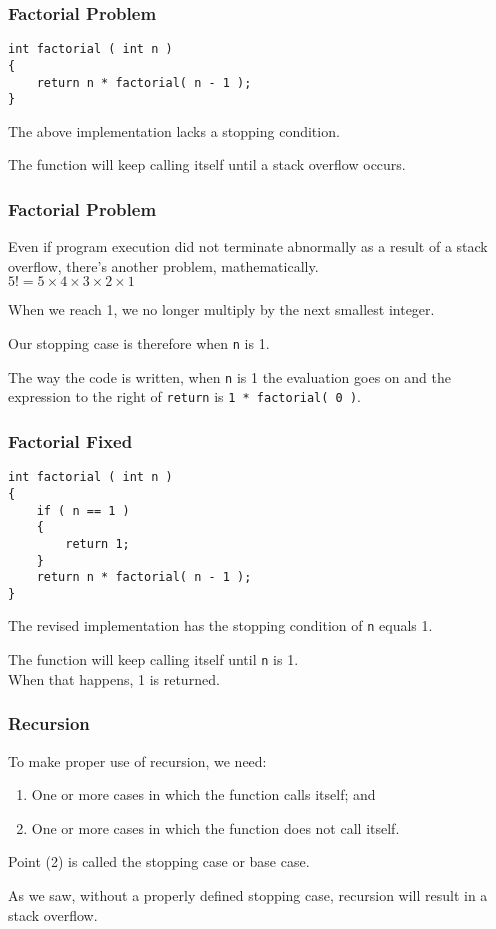 \begin{frame}[fragile]
\frametitle{Factorial Problem}
\begin{verbatim}
int factorial ( int n )
{
    return n * factorial( n - 1 );
}
\end{verbatim}

The above implementation lacks a \alert{stopping condition}.

The function will keep calling itself until a stack overflow occurs.

\end{frame}

\begin{frame}
\frametitle{Factorial Problem}

Even if program execution did not terminate abnormally as a result of a stack overflow, there's another problem, mathematically.\\
\quad $5! = 5 \times 4 \times 3 \times 2 \times 1$

When we reach 1, we no longer multiply by the next smallest integer.

Our stopping case is therefore when \texttt{n} is 1.

The way the code is written, when \texttt{n} is 1 the evaluation goes on and the expression to the right of \texttt{return} is \texttt{1 * factorial( 0 )}. 

\end{frame}

\begin{frame}[fragile]
\frametitle{Factorial Fixed}
\begin{verbatim}
int factorial ( int n )
{
    if ( n == 1 )
    {
        return 1;
    }
    return n * factorial( n - 1 );
}
\end{verbatim}

The revised implementation has the stopping condition of \texttt{n} equals 1.

The function will keep calling itself until \texttt{n} is 1.\\
\quad When that happens, 1 is returned.

\end{frame}

\begin{frame}
\frametitle{Recursion}
To make proper use of recursion, we need:
\begin{enumerate}
	\item One or more cases in which the function calls itself; and
	\item One or more cases in which the function does not call itself.
\end{enumerate}

Point (2) is called the stopping case or base case.

As we saw, without a properly defined stopping case, recursion will result in a stack overflow.

\end{frame}

